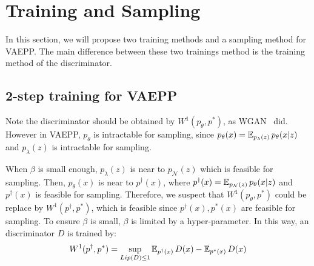 \section{Training and Sampling}\label{sec:vaepp}
In this section, we will propose two training methods and a sampling method for VAEPP. The main difference between these two trainings method is the training method of the discriminator. 

\subsection{2-step training for VAEPP} \label{subsec:naive_vaepp}
Note the discriminator should be obtained by $W^1(p_\theta, p^*)$, as WGAN~\cite{arjovsky2017wasserstein} did. However in VAEPP, $p_\theta$ is intractable for sampling, since $p_\theta(x) = \operatorname{\mathbb{E}}_{p_\lambda(z)} p_\theta(x|z)$ and $p_\lambda(z)$ is intractable for sampling. 

When $\beta$ is small enough, $p_\lambda(z)$ is near to $p_\mathcal{N}(z)$ which is feasible for sampling. Then, $p_\theta(x)$ is near to $p^\dag(x)$, where $p^\dag(x) = \operatorname{\mathbb{E}}_{p_\mathcal{N}(z)} p_\theta(x|z)$ and $p^\dag(x)$ is feasible for sampling. Therefore, we suspect that $W^1(p_\theta, p^*)$ could be replace by $W^1(p^\dag, p^*)$, which is feasible since $p^\dag(x), p^*(x)$ are feasible for sampling. To ensure $\beta$ is small, $\beta$ is limited by a hyper-parameter. 
In this way, an discriminator $D$ is trained by:
\begin{equation*}
	W^1(p^\dag, p^*) = \sup_{Lip(D) \leq 1} \operatorname{\mathbb{E}}_{p^\dag(x)} D(x) - \operatorname{\mathbb{E}}_{p^*(x)} D(x)
\end{equation*} 

